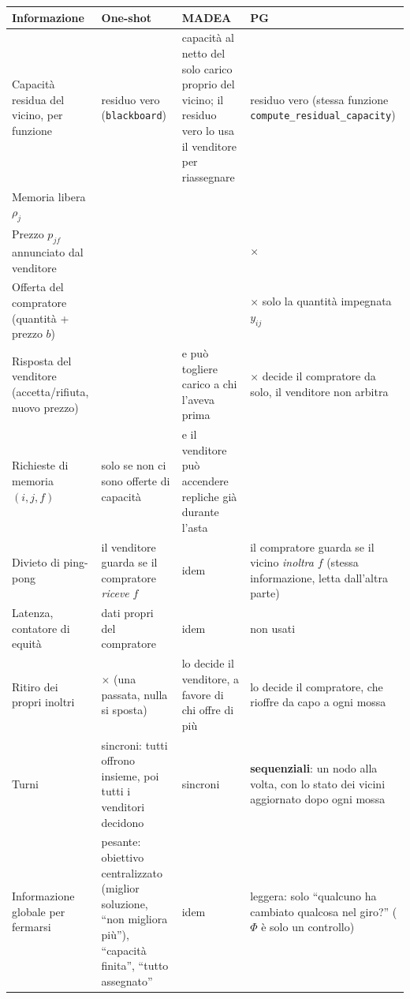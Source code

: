 \documentclass[11pt,a4paper]{article}
\newcommand{\Phiv}{\Phi}
\newcommand{\code}[1]{\texttt{#1}}
\begin{document}
\newcommand{\si}{\checkmark}
\newcommand{\no}{$\times$}
\begin{center}
\footnotesize\renewcommand{\arraystretch}{1.35}
\begin{tabularx}{\textwidth}{@{}>{\raggedright\arraybackslash}p{3.3cm}
  >{\raggedright\arraybackslash}X >{\raggedright\arraybackslash}X
  >{\raggedright\arraybackslash}X@{}}
\toprule
Informazione & One-shot & MADEA & PG \\
\midrule
Capacit\`a residua del vicino, per funzione
  & \si{} residuo vero (\code{blackboard})
  & \si{} capacit\`a al netto del solo carico proprio del vicino; il residuo
    vero lo usa il venditore per riassegnare
  & \si{} residuo vero (stessa funzione \code{compute\_residual\_\allowbreak capacity}) \\
Memoria libera $\rho_j$ & \si & \si & \si \\
Prezzo $p_{jf}$ annunciato dal venditore & \si & \si & \no \\
Offerta del compratore (quantit\`a + prezzo $b$)
  & \si & \si & \no{} solo la quantit\`a impegnata $y_{ij}$ \\
Risposta del venditore (accetta/rifiuta, nuovo prezzo)
  & \si & \si{} e pu\`o togliere carico a chi l'aveva prima
  & \no{} decide il compratore da solo, il venditore non arbitra \\
Richieste di memoria $(i,j,f)$
  & \si{} solo se non ci sono offerte di capacit\`a
  & \si{} e il venditore pu\`o accendere repliche gi\`a durante l'asta
  & \si \\
Divieto di ping-pong
  & il venditore guarda se il compratore \emph{riceve} $f$
  & idem
  & il compratore guarda se il vicino \emph{inoltra} $f$ (stessa
    informazione, letta dall'altra parte) \\
Latenza, contatore di equit\`a
  & dati propri del compratore & idem & non usati \\
Ritiro dei propri inoltri
  & \no{} (una passata, nulla si sposta)
  & lo decide il venditore, a favore di chi offre di pi\`u
  & lo decide il compratore, che rioffre da capo a ogni mossa \\
Turni
  & sincroni: tutti offrono insieme, poi tutti i venditori decidono
  & sincroni
  & \textbf{sequenziali}: un nodo alla volta, con lo stato dei vicini
    aggiornato dopo ogni mossa \\
Informazione globale per fermarsi
  & pesante: obiettivo centralizzato (miglior soluzione, ``non migliora
    pi\`u''), ``capacit\`a finita'', ``tutto assegnato''
  & idem
  & leggera: solo ``qualcuno ha cambiato qualcosa nel giro?''
    ($\Phiv$ \`e solo un controllo) \\
\bottomrule
\end{tabularx}
\end{center}
\end{document}
